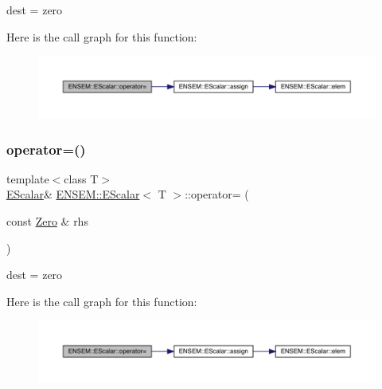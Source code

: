 dest = zero 

Here is the call graph for this function\+:
\nopagebreak
\begin{figure}[H]
\begin{center}
\leavevmode
\includegraphics[width=350pt]{d0/d82/classENSEM_1_1EScalar_a9619fd24baf50fd03986c3056a484cb9_cgraph}
\end{center}
\end{figure}
\mbox{\label{classENSEM_1_1EScalar_a9619fd24baf50fd03986c3056a484cb9}} 
\subsubsection{\texorpdfstring{operator=()}{operator=()}\hspace{0.1cm}{\footnotesize\ttfamily [5/12]}}
{\footnotesize\ttfamily template$<$class T$>$ \\
\mbox{\hyperlink{classENSEM_1_1EScalar}{E\+Scalar}}\& \mbox{\hyperlink{classENSEM_1_1EScalar}{E\+N\+S\+E\+M\+::\+E\+Scalar}}$<$ T $>$\+::operator= (\begin{DoxyParamCaption}\item[{const \mbox{\hyperlink{structENSEM_1_1Zero}{Zero}} \&}]{rhs }\end{DoxyParamCaption})\hspace{0.3cm}{\ttfamily [inline]}}



dest = zero 

Here is the call graph for this function\+:
\nopagebreak
\begin{figure}[H]
\begin{center}
\leavevmode
\includegraphics[width=350pt]{d0/d82/classENSEM_1_1EScalar_a9619fd24baf50fd03986c3056a484cb9_cgraph}
\end{center}
\end{figure}
\mbox{\label{classENSEM_1_1EScalar_a9619fd24baf50fd03986c3056a484cb9}} 

